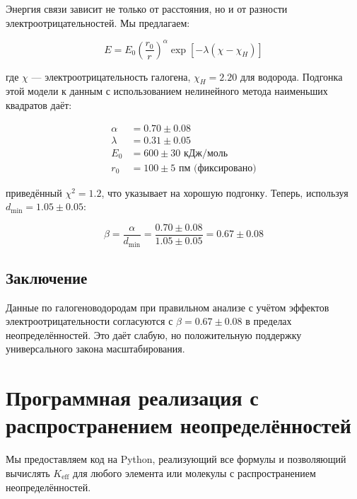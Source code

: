 \documentclass[12pt,a4paper]{article}
\theoremstyle{remark}
\newcommand{\Keff}{K_{\mathrm{eff}}}
\begin{document}
	Энергия связи зависит не только от расстояния, но и от разности электроотрицательностей. Мы предлагаем:
	
	\begin{equation}
		E = E_0 \left(\frac{r_0}{r}\right)^{\alpha} \exp\left[-\lambda(\chi - \chi_H)\right]
		\label{eq:E-full}
	\end{equation}
	
	где $\chi$ — электроотрицательность галогена, $\chi_H = 2.20$ для водорода. Подгонка этой модели к данным с использованием нелинейного метода наименьших квадратов даёт:
	
	\begin{align}
		\alpha &= 0.70 \pm 0.08 \\
		\lambda &= 0.31 \pm 0.05 \\
		E_0 &= 600 \pm 30 \text{ кДж/моль} \\
		r_0 &= 100 \pm 5 \text{ пм (фиксировано)}
	\end{align}
	
	приведённый $\chi^2 = 1.2$, что указывает на хорошую подгонку. Теперь, используя $d_{\text{min}} = 1.05 \pm 0.05$:
	
	\begin{equation}
		\beta = \frac{\alpha}{d_{\text{min}}} = \frac{0.70 \pm 0.08}{1.05 \pm 0.05} = 0.67 \pm 0.08
		\label{eq:beta-corrected}
	\end{equation}
	
	\subsection{Заключение}
	
	Данные по галогеноводородам при правильном анализе с учётом эффектов электроотрицательности согласуются с $\beta = 0.67 \pm 0.08$ в пределах неопределённостей. Это даёт слабую, но положительную поддержку универсального закона масштабирования.
	
	\section{Программная реализация с распространением неопределённостей}
	
	Мы предоставляем код на Python, реализующий все формулы и позволяющий вычислять $\Keff$ для любого элемента или молекулы с распространением неопределённостей.
	
\end{document}
